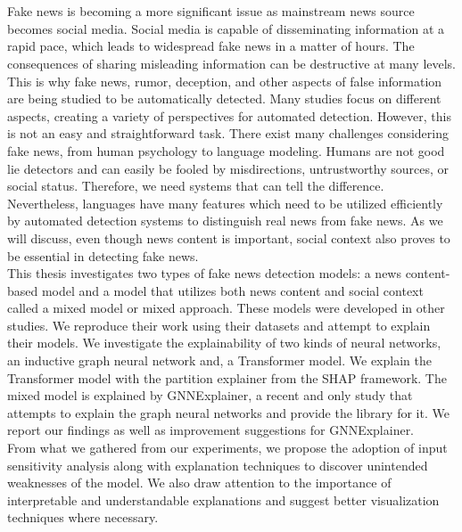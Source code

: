 \chapter{\abstractname}


Fake news is becoming a more significant issue as mainstream news source becomes social media. Social media is capable of disseminating information at a rapid pace, which leads to widespread fake news in a matter of hours. The consequences of sharing misleading information can be destructive at many levels. This is why fake news, rumor, deception, and other aspects of false information are being studied to be automatically detected. Many studies focus on different aspects, creating a variety of perspectives for automated detection. However, this is not an easy and straightforward task. There exist many challenges considering fake news, from human psychology to language modeling. Humans are not good lie detectors and can easily be fooled by misdirections, untrustworthy sources, or social status. Therefore, we need systems that can tell the difference.\\
Nevertheless, languages have many features which need to be utilized efficiently by automated detection systems to distinguish real news from fake news. As we will discuss, even though news content is important, social context also proves to be essential in detecting fake news.\\
This thesis investigates two types of fake news detection models: a news content-based model and a model that utilizes both news content and social context called a mixed model or mixed approach.  These models were developed in other studies. We reproduce their work using their datasets and attempt to explain their models. We investigate the explainability of two kinds of neural networks, an inductive graph neural network and, a Transformer model. We explain the Transformer model with the partition explainer from the SHAP framework. The mixed model is explained by GNNExplainer, a recent and only study that attempts to explain the graph neural networks and provide the library for it. We report our findings as well as improvement suggestions for GNNExplainer.\\
From what we gathered from our experiments, we propose the adoption of input sensitivity analysis along with explanation techniques to discover unintended weaknesses of  the model. We also draw attention to the importance of interpretable and understandable explanations and suggest better visualization techniques where necessary.
